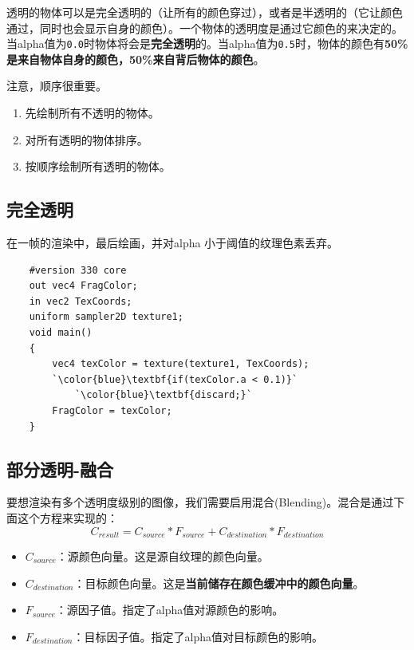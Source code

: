 \documentclass[UTF8,a4paper,12pt]{ctexbook}
\begin{document}
		透明的物体可以是完全透明的（让所有的颜色穿过），或者是半透明的（它让颜色通过，同时也会显示自身的颜色）。一个物体的透明度是通过它颜色的来决定的。当alpha值为\verb|0.0|时物体将会是\textbf{完全透明}的。当alpha值为\verb|0.5|时，物体的颜色有\textbf{50\%是来自物体自身的颜色，50\%来自背后物体的颜色}。
		
		
		注意，顺序很重要。
		\begin{enumerate}[itemindent = 1em]
			\item 先绘制所有不透明的物体。
			\item 对所有透明的物体排序。
			\item 按顺序绘制所有透明的物体。
		\end{enumerate}
		
		\subsection{完全透明}
			
			在一帧的渲染中，最后绘画，并对alpha 小于阈值的纹理色素丢弃。
			\begin{lstlisting}
	#version 330 core
	out vec4 FragColor;
	in vec2 TexCoords;
	uniform sampler2D texture1;
	void main()
	{             
	    vec4 texColor = texture(texture1, TexCoords);
	    `\color{blue}\textbf{if(texColor.a < 0.1)}`
	        `\color{blue}\textbf{discard;}`
	    FragColor = texColor;
	}			
			\end{lstlisting}
		
		
		\subsection{部分透明-融合}
			要想渲染有多个透明度级别的图像，我们需要启用混合(Blending)。混合是通过下面这个方程来实现的：
				$$ C_{result} = C_{source}*F_{source} + C_{destination}*F_{destination}$$
				
			\begin{itemize}
				\item $C_{source}$：源颜色向量。这是源自纹理的颜色向量。
				\item $C_{destination}$：目标颜色向量。这是\textbf{当前储存在颜色缓冲中的颜色向量}。
				\item $F_{source}$：源因子值。指定了alpha值对源颜色的影响。
				\item $F_{destination}$：目标因子值。指定了alpha值对目标颜色的影响。
			\end{itemize}
		
\end{document}
